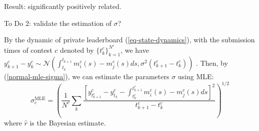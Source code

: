\documentclass[mnsc]{informs3}
\begin{document}
Result: significantly positively related. 

To Do 2: validate the estimation of $\sigma$?

By the dynamic of private leaderboard (\ref{eq-state-dynamics}), with the submission times of contest $c$ denoted by $\{t^c_k\}^{N^c}_{k=1}$, we have $y^c_{k+1} - y^c_{k} \sim \mathcal{N}\left(\int^{t_{k+1}}_{t_k}m^c_i(s) - m^c_j(s)ds, \sigma^2(t^c_{k+1}-t^c_k)\right)$ . 
Then, by (\ref{normal-mle-sigma}), we can estimate the parameters $\sigma$ using MLE: 
\begin{equation*}
\sigma^{\text{MLE}}_c = \left(\frac{1}{N^c}\sum_k\frac{\left[y^c_{t^c_{k+1}}-y^c_{t_k}-\int^{t^c_{k+1}}_{t^c_k}m^c_i(s) - m^c_j(s)ds\right]^2}{t^c_{k+1}-t^c_k}\right)^{1/2}
\end{equation*}
where $\hat{r}$ is the Bayesian estimate. 
\end{document}
